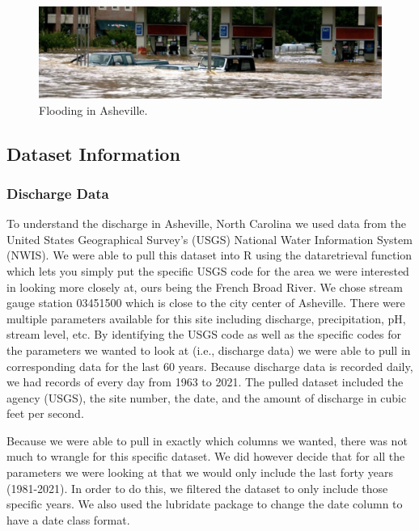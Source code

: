\documentclass[
]{article}
\begin{document}
\begin{figure}
\includegraphics[width=1\linewidth]{Photo_2} \caption{Flooding in Asheville.}\label{fig:unnamed-chunk-2}
\end{figure}

\newpage

\hypertarget{dataset-information}{%
\subsection{\texorpdfstring{\textbf{Dataset
Information}}{Dataset Information}}\label{dataset-information}}

\hypertarget{discharge-data}{%
\subsubsection{\texorpdfstring{\textbf{Discharge
Data}}{Discharge Data}}\label{discharge-data}}

To understand the discharge in Asheville, North Carolina we used data
from the United States Geographical Survey's (USGS) National Water
Information System (NWIS). We were able to pull this dataset into R
using the dataretrieval function which lets you simply put the specific
USGS code for the area we were interested in looking more closely at,
ours being the French Broad River. We chose stream gauge station
03451500 which is close to the city center of Asheville. There were
multiple parameters available for this site including discharge,
precipitation, pH, stream level, etc. By identifying the USGS code as
well as the specific codes for the parameters we wanted to look at
(i.e., discharge data) we were able to pull in corresponding data for
the last 60 years. Because discharge data is recorded daily, we had
records of every day from 1963 to 2021. The pulled dataset included the
agency (USGS), the site number, the date, and the amount of discharge in
cubic feet per second.

Because we were able to pull in exactly which columns we wanted, there
was not much to wrangle for this specific dataset. We did however decide
that for all the parameters we were looking at that we would only
include the last forty years (1981-2021). In order to do this, we
filtered the dataset to only include those specific years. We also used
the lubridate package to change the date column to have a date class
format.
\end{document}
